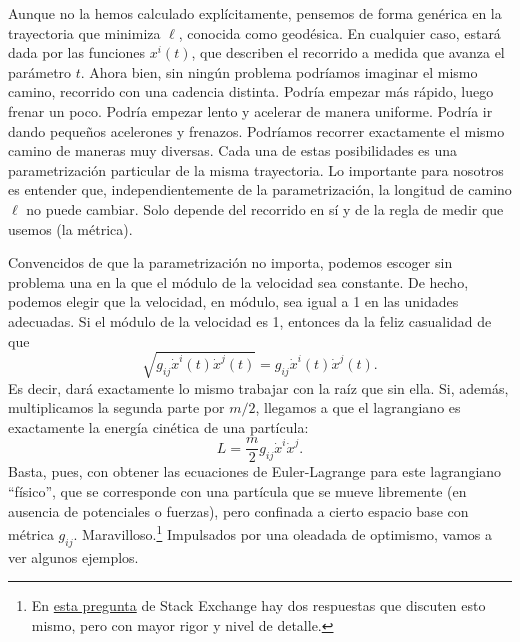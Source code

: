 Aunque no la hemos calculado explícitamente, pensemos de forma genérica en la trayectoria que minimiza \(\ell\), conocida como geodésica.  En cualquier caso, estará dada por las funciones \(x^i(t)\), que describen el recorrido a medida que avanza el parámetro \(t\). Ahora bien, sin ningún problema podríamos imaginar el mismo camino, recorrido con una cadencia distinta. Podría empezar más rápido, luego frenar un poco. Podría empezar lento y acelerar de manera uniforme. Podría ir dando pequeños acelerones y frenazos. Podríamos recorrer exactamente el mismo camino de maneras muy diversas. Cada una de estas posibilidades es una parametrización particular de la misma trayectoria. Lo importante para nosotros es entender que, independientemente de la parametrización, la longitud de camino \(\ell\) no puede cambiar. Solo depende del recorrido en sí y de la regla de medir que usemos (la métrica).  

Convencidos de que la parametrización no importa, podemos escoger sin problema una en la que el módulo de la velocidad sea constante. De hecho, podemos elegir que la velocidad, en módulo, sea igual a 1 en las unidades adecuadas. Si el módulo de la velocidad es 1, entonces da la feliz casualidad de que 
\begin{equation*}
    \sqrt{g_{ij}\dot{x}^i(t)\dot{x}^j(t)} = g_{ij}\dot{x}^i(t)\dot{x}^j(t).
\end{equation*}
Es decir, dará exactamente lo mismo trabajar con la raíz que sin ella. Si, además, multiplicamos la segunda parte por \(m/2\), llegamos a que el lagrangiano es exactamente la energía cinética de una partícula:
\begin{equation}
    \label{eq.1-lagrangiano-libre}
    L = \frac{m}{2}g_{ij}\dot{x}^i\dot{x}^j.
\end{equation}
Basta, pues, con obtener las ecuaciones de Euler-Lagrange para este lagrangiano ``físico'', que se corresponde con una partícula que se mueve libremente (en ausencia de potenciales o fuerzas), pero confinada a cierto espacio base con métrica \(g_{ij}\). Maravilloso.\footnote{En \href{https://physics.stackexchange.com/questions/149082/geodesic-equation-from-variation-is-the-squared-lagrangian-equivalent?noredirect=1&lq=1}{esta pregunta} de Stack Exchange hay dos respuestas que discuten esto mismo, pero con mayor rigor y nivel de detalle.} Impulsados por una oleadada de optimismo, vamos a ver algunos ejemplos. 

